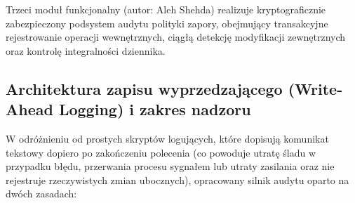 Trzeci moduł funkcjonalny (autor: Aleh Shehda) realizuje kryptograficznie zabezpieczony podsystem audytu polityki zapory, obejmujący transakcyjne rejestrowanie operacji wewnętrznych, ciągłą detekcję modyfikacji zewnętrznych oraz kontrolę integralności dziennika.

\subsection{Architektura zapisu wyprzedzającego (Write-Ahead Logging) i zakres nadzoru}\label{subsec:rejestrowanie-operacji}

W odróżnieniu od prostych skryptów logujących, które dopisują komunikat tekstowy dopiero po zakończeniu polecenia (co powoduje utratę śladu w przypadku błędu, przerwania procesu sygnałem  lub utraty zasilania oraz nie rejestruje rzeczywistych zmian ubocznych), opracowany silnik audytu oparto na dwóch zasadach:


